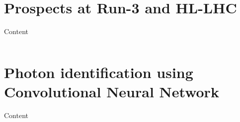 \documentclass[10pt,aspectratio=169]{beamer}
\begin{document}



\section{Prospects at Run-3 and HL-LHC}

\begin{frame}{Content}
\label{content}
    \begin{columns}[t]
        \begin{column}{.5\textwidth}
            \tableofcontents[sections={1-5},currentsection]
        \end{column}
        \begin{column}{.5\textwidth}
            \tableofcontents[sections={6-},currentsection]
        \end{column}
    \end{columns}
\end{frame}



{
\begin{frame}
\end{frame}
}

\section{Photon identification using Convolutional Neural Network}

\begin{frame}{Content}
\label{content}
    \begin{columns}[t]
        \begin{column}{.5\textwidth}
            \tableofcontents[sections={1-5},currentsection]
        \end{column}
        \begin{column}{.5\textwidth}
            \tableofcontents[sections={6-},currentsection]
        \end{column}
    \end{columns}
\end{frame}
\end{document}

